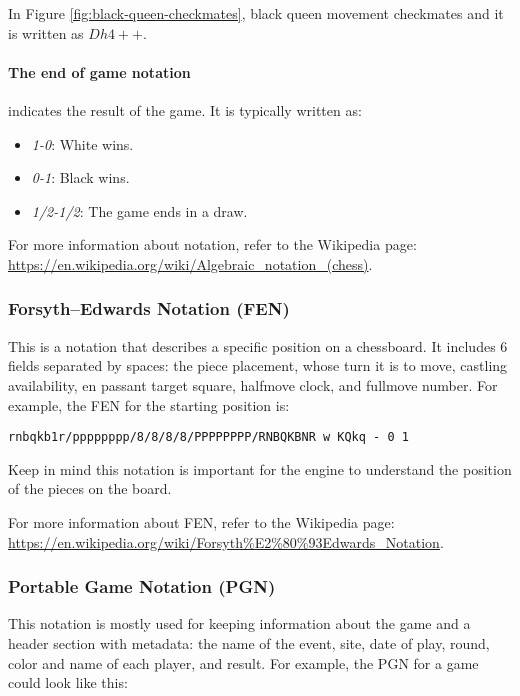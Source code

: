 \noindent In Figure \ref{fig:black-queen-checkmates}, black queen movement checkmates and it is written as $Dh4++$.

\paragraph{The end of game notation} indicates the result of the game. It is typically written as:

\begin{itemize}
    \item \textit{1-0}: White wins.
    \item \textit{0-1}: Black wins.
    \item \textit{1/2-1/2}: The game ends in a draw.
\end{itemize}

\noindent For more information about notation, refer to the Wikipedia page: \url{https://en.wikipedia.org/wiki/Algebraic_notation_(chess)}.

\subsubsection{Forsyth–Edwards Notation (FEN)}

This is a notation that describes a specific position on a chessboard. It includes 6 fields separated by spaces: the piece placement, whose turn it is to move, castling availability, en passant target square, halfmove clock, and fullmove number.
For example, the FEN for the starting position is:
\begin{verbatim}
rnbqkb1r/pppppppp/8/8/8/8/PPPPPPPP/RNBQKBNR w KQkq - 0 1
\end{verbatim}

\vspace{1em}

\noindent Keep in mind this notation is important for the engine to understand the position of the pieces on the board.

\vspace{1em}

\noindent For more information about FEN, refer to the Wikipedia page: \url{https://en.wikipedia.org/wiki/Forsyth%E2%80%93Edwards_Notation}.

\subsubsection{Portable Game Notation (PGN)}

This notation is mostly used for keeping information about the game and a header section with metadata: the name of the event, site, date of play, round, color and name of each player, and result. For example, the PGN for a game could look like this:

